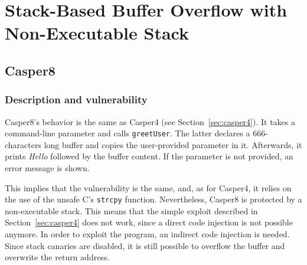 \section{Stack-Based Buffer Overflow with Non-Executable Stack} \label{sec:nonEx}
\subsection{Casper8}
\subsubsection{Description and vulnerability}
Casper8's behavior is the same as Casper4 (see Section~\ref{sec:casper4}). It takes a command-line parameter and calls \texttt{greetUser}. The latter declares a 666-characters long buffer and copies the user-provided parameter in it. Afterwards, it prints \textit{Hello} followed by the buffer content. If the parameter is not provided, an error message is shown.

This implies that the vulnerability is the same, and, as for Casper4, it relies on the use of the unsafe C's \texttt{strcpy} function. Nevertheless, Casper8 is protected by a non-executable stack. This means that the simple exploit described in Section~\ref{sec:casper4} does not work, since a direct code injection is not possible anymore. In order to exploit the program, an indirect code injection is needed. Since stack canaries are disabled, it is still possible to overflow the buffer and overwrite the return address.

